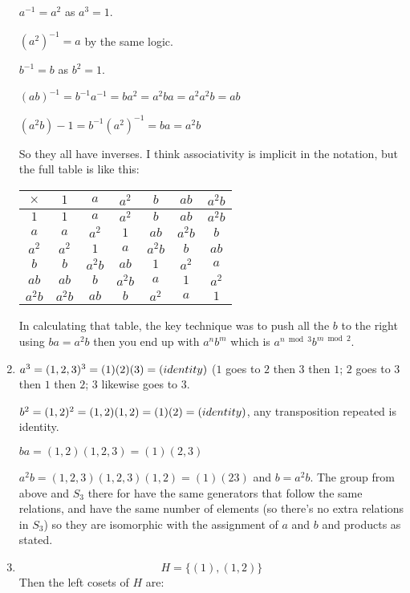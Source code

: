 \documentclass[11pt,oneside]{article}
\numberwithin{equation}{section}
\theoremstyle{definition}
\begin{document}
\begin{solution}
\begin{enumerate}
    $a ^{-1} = a^2$ as $a^3 = 1$.
    
    $(a^2)^{-1} = a$ by the same logic.
    
    $b^{-1} = b$ as $b^2 = 1$.

    $(ab) ^ {-1} = b^ {-1} a^{-1} = b a^2 = a^2 b a = a^2 a^2 b = ab$

    $(a^2 b ) -1 = b^{-1} (a^2)^{-1}= b a = a^2 b$

    So they all have inverses.  I think associativity is implicit in the notation, but the full table is like this:

      \begin{center}
    \begin{tabular}{ |c|c|c|c|c|c|c| }
      \hline
          {$\times$} & $1$     & $a$    & $a^2$  & $b$    & $ab$    & $a^2 b $ \\
          \hline
          $1$        & $1$     & $a$    & $a^2$  & $b$    & $ab$    & $a^2 b $ \\
          $a$        & $a$     & $a^2$  & $1$    & $ab$   & $a^2 b$ & $b$      \\
          $a^2$      & $a^2$   & $1$    & $a$    & $a^2b$ & $b$     & $ab$     \\
          $b$        & $ b$    & $a^2b$ & $ab$   & $1$    & $a^2$   & $a$      \\
          $ab$       & $ab$    & $b$    & $a^2b$ & $a$    & $1$     & $a^2$    \\
          $a^2b$     & $a^2b$  & $ab$   & $b$    & $a^2$  & $a$     & $1$      \\
          \hline
    \end{tabular}
  \end{center}

    In calculating that table, the key technique was to push all the $b$ to the right using
    $ ba = a^2b$ then you end up with $a^nb^m$ which is $a^{n \bmod 3}b^{m \bmod 2}$.

  \item
      $a^3 = (1, 2, 3)^3 = (1)(2)(3) = \textrm(identity)$ ($1$ goes to $2$ then $3$ then $1$; $2$ goes to $3$ then $1$ then $2$; $3$ likewise goes to $3$.

      $b^2 = (1, 2)^2 = (1, 2)(1, 2) = (1) (2) = \textrm(identity)$, any transposition repeated is identity.

      $ba = (1, 2)(1, 2, 3) = (1) (2, 3)$

      $a^2b = (1, 2, 3)(1, 2, 3)(1, 2) = (1)(2 3)$ and $b = a^2b$.
      The group from above and $S_3$ there for have the same
      generators that follow the same relations, and have the same
      number of elements (so there's no extra relations in $S_3$) so
      they are isomorphic with the assignment of $a$ and $b$ and
      products as stated.
    \item
      $$
      H = \{ (1), (1, 2) \}
      $$
      Then the left cosets of $H$ are:


\end{enumerate}
\end{solution}
\end{document}
